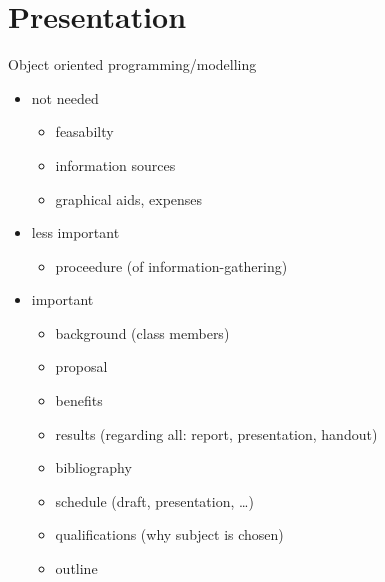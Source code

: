 \chapter{Presentation}
Object oriented programming/modelling
\begin{itemize}
\item not needed
\begin{itemize}
\item feasabilty
\item information sources
\item graphical aids, expenses
\end{itemize}
\item less important
\begin{itemize}
\item proceedure (of information-gathering)
\end{itemize}
\item important
\begin{itemize}
\item background (class members)
\item proposal
\item benefits
\item results (regarding all: report, presentation, handout)
\item bibliography
\item schedule (draft, presentation, …)
\item qualifications (why subject is chosen)
\item outline
\end{itemize}
\end{itemize}

